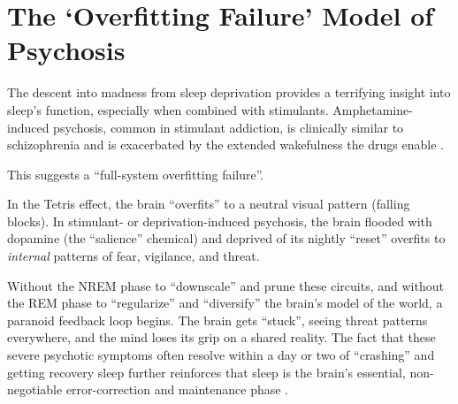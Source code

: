 \section{The `Overfitting Failure' Model of Psychosis}\label{sec:obh_psychosis}

The descent into madness from sleep deprivation provides a terrifying insight into sleep's function, especially when combined with stimulants. Amphetamine-induced psychosis, common in stimulant addiction, is clinically similar to schizophrenia and is exacerbated by the extended wakefulness the drugs enable \citep{lechi2012amphetamine}.

This suggests a ``full-system overfitting failure''.

In the Tetris effect, the brain ``overfits'' to a neutral visual pattern (falling blocks). In stimulant- or deprivation-induced psychosis, the brain \- flooded with dopamine (the ``salience'' chemical) and deprived of its nightly ``reset'' \- overfits to \textit{internal} patterns of fear, vigilance, and threat.

Without the NREM phase to ``downscale'' and prune these circuits, and without the REM phase to ``regularize'' and ``diversify'' the brain's model of the world, a paranoid feedback loop begins. The brain gets ``stuck'', seeing threat patterns everywhere, and the mind loses its grip on a shared reality. The fact that these severe psychotic symptoms often resolve within a day or two of ``crashing'' and getting recovery sleep further reinforces that sleep is the brain's essential, non-negotiable error-correction and maintenance phase \citep{waters2018deprivation}.
